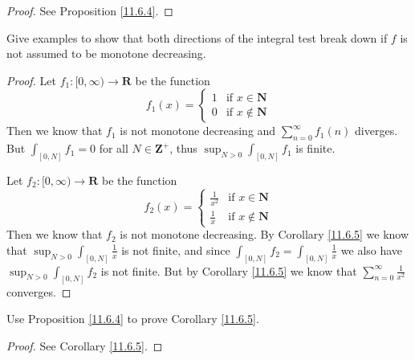 \begin{proof}
    See Proposition \ref{11.6.4}.
\end{proof}

\begin{exercise}\label{ex 11.6.4}
    Give examples to show that both directions of the integral test break down if \(f\) is not assumed to be monotone decreasing.
\end{exercise}

\begin{proof}
    Let \(f_1 : [0, \infty) \to \mathbf{R}\) be the function
    \[
        f_1(x) = \begin{cases}
            1 & \text{if } x \in \mathbf{N}    \\
            0 & \text{if } x \notin \mathbf{N}
        \end{cases}
    \]
    Then we know that \(f_1\) is not monotone decreasing and \(\sum_{n = 0}^\infty f_1(n)\) diverges.
    But \(\int_{[0, N]} f_1 = 0\) for all \(N \in \mathbf{Z}^+\), thus \(\sup_{N > 0} \int_{[0, N]} f_1\) is finite.

    Let \(f_2 : [0, \infty) \to \mathbf{R}\) be the function
    \[
        f_2(x) = \begin{cases}
            \frac{1}{x^2} & \text{if } x \in \mathbf{N}    \\
            \frac{1}{x}   & \text{if } x \notin \mathbf{N}
        \end{cases}
    \]
    Then we know that \(f_2\) is not monotone decreasing.
    By Corollary \ref{11.6.5} we know that \(\sup_{N > 0} \int_{[0, N]} \frac{1}{x}\) is not finite, and since \(\int_{[0, N]} f_2 = \int_{[0, N]} \frac{1}{x}\) we also have \(\sup_{N > 0} \int_{[0, N]} f_2\) is not finite.
    But by Corollary \ref{11.6.5} we know that \(\sum_{n = 0}^\infty \frac{1}{x^2}\) converges.
\end{proof}

\begin{exercise}\label{ex 11.6.5}
    Use Proposition \ref{11.6.4} to prove Corollary \ref{11.6.5}.
\end{exercise}

\begin{proof}
    See Corollary \ref{11.6.5}.
\end{proof}